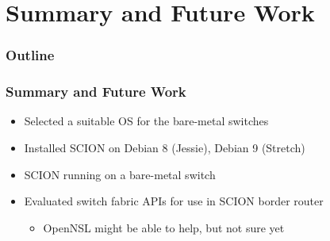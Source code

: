 \documentclass[12pt]{beamer}
\begin{document}

\section{Summary and Future Work}

\begin{frame}
\frametitle{Outline}
\tableofcontents[currentsection]
\end{frame}

\begin{frame}
\frametitle{Summary and Future Work}
\begin{itemize}
    \item Selected a suitable OS for the bare-metal switches
    \item Installed SCION on Debian 8 (Jessie), Debian 9 (Stretch)
    \item SCION running on a bare-metal switch
    \item Evaluated switch fabric APIs for use in SCION border router
    \begin{itemize}
        \item OpenNSL might be able to help, but not sure yet
    \end{itemize}
\end{itemize}
\end{frame}
\end{document}
